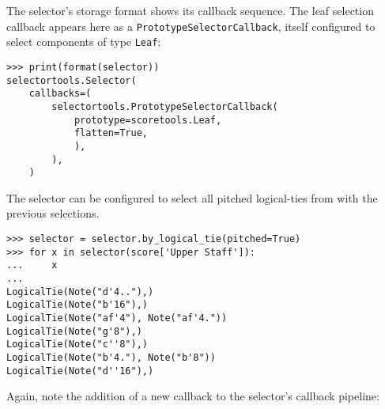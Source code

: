 \noindent The selector's storage format shows its callback sequence. The leaf
selection callback appears here as a \texttt{PrototypeSelectorCallback}, itself
configured to select components of type \texttt{Leaf}:

\begin{comment}
<abjad>
print(format(selector))
</abjad>
\end{comment}

\begin{abjadbookoutput}
\begin{singlespacing}
\vspace{-0.5\baselineskip}
\begin{verbatim}
>>> print(format(selector))
selectortools.Selector(
    callbacks=(
        selectortools.PrototypeSelectorCallback(
            prototype=scoretools.Leaf,
            flatten=True,
            ),
        ),
    )
\end{verbatim}
\end{singlespacing}
\end{abjadbookoutput}

\noindent The selector can be configured to select all pitched logical-ties
from with the previous selections.

\begin{comment}
<abjad>
selector = selector.by_logical_tie(pitched=True)
for x in selector(score['Upper Staff']):
    x

</abjad>
\end{comment}

\begin{abjadbookoutput}
\begin{singlespacing}
\vspace{-0.5\baselineskip}
\begin{verbatim}
>>> selector = selector.by_logical_tie(pitched=True)
>>> for x in selector(score['Upper Staff']):
...     x
...
LogicalTie(Note("d'4.."),)
LogicalTie(Note("b'16"),)
LogicalTie(Note("af'4"), Note("af'4."))
LogicalTie(Note("g'8"),)
LogicalTie(Note("c''8"),)
LogicalTie(Note("b'4."), Note("b'8"))
LogicalTie(Note("d''16"),)
\end{verbatim}
\end{singlespacing}
\end{abjadbookoutput}

\noindent Again, note the addition of a new callback to the selector's callback
pipeline:

\begin{comment}
<abjad>
print(format(selector))
</abjad>
\end{comment}

